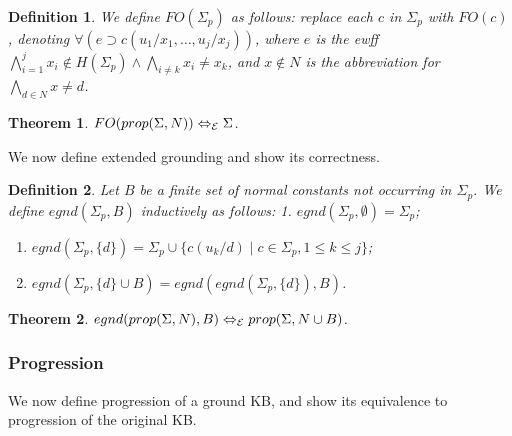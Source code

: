 \documentclass[letterpaper]{article}
\newtheorem{THEOREM}{Theorem}
\newenvironment{theorem}{\begin{THEOREM} }%
                        {\end{THEOREM}}
\newtheorem{DEFINITION}{Definition}
\newenvironment{definition}{\begin{DEFINITION} \rm }
                            {\end{DEFINITION}}
\newcommand{\Eaxiom}{{\M{\cal E}}}
\gdef\M#1{\ifmmode #1\else$#1$\fi}
\newcommand{\Eequiv}{\Leftrightarrow_{\Eaxiom}}
\begin{document}
\begin{definition} We define $FO(\Sigma_p)$ as follows: replace each $c$ in $\Sigma_p$ with $FO(c)$, denoting $\forall (e \supset c(u_1/x_1, \ldots, u_{j}/x_{j}))$, where $e$ is the ewff $\bigwedge^j_{i = 1}x_i\not\in H(\Sigma_p) \wedge \bigwedge_{i \neq k}x_i \neq x_k$, and $x\not \in N$ is the abbreviation for $\bigwedge_{d\in N}x\neq d$.
\end{definition}

\begin{theorem} \label{gnd-thm} $FO(prop(\Sigma, N)) \Eequiv \Sigma$.
\end{theorem}

\noindent We now define extended grounding and show its correctness.

\begin{definition} \label{extend-ground-def}
Let $B$ be a finite set of normal constants not occurring in $\Sigma_p$. We define $egnd(\Sigma_p,B)$ inductively as follows: 1. $egnd(\Sigma_p, \emptyset) = \Sigma_p$;
\vspace*{-1mm}\begin{enumerate}\addtolength{\itemsep}{-0.3ex}
\item[2.] $egnd(\Sigma_p, \{d\}) = \Sigma_p \cup \{c(u_k/d)\mid c\in \Sigma_p, 1\leq k\leq j\}$;
\item[3.] $egnd(\Sigma_p, \{d\} \cup B) = egnd(egnd(\Sigma_p, \{d\}), B)$.
\end{enumerate}
\end{definition}


\begin{theorem}\label{egnd-thm}
$egnd(prop(\Sigma, N), B)\Eequiv prop(\Sigma,N\cup B)$.
\end{theorem}


\subsubsection{Progression}

We now define progression of a ground KB, and show its equivalence to progression of the original KB. %
\end{document}
